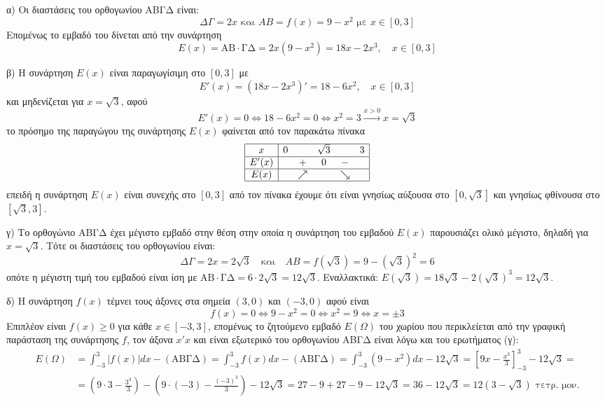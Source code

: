 α) Οι διαστάσεις του ορθογωνίου ΑΒΓΔ είναι:
\[ \Delta\Gamma = 2x \text{ και } AB = f(x) = 9-x^2 \text{ με } x \in [0,3] \]
Επομένως το εμβαδό του δίνεται από την συνάρτηση
\[ E(x) = \text{ΑΒ} \cdot \text{ΓΔ} = 2x(9-x^2) = 18x - 2x^3, \quad x \in [0,3] \]

β) Η συνάρτηση $E(x)$ είναι παραγωγίσιμη στο $[0,3]$ με
\[ E'(x)=(18x-2x^3)' = 18-6x^2, \quad x \in [0,3] \]
και μηδενίζεται για $x = \sqrt{3}$, αφού
\[ E'(x)=0 \Leftrightarrow 18-6x^2=0 \Leftrightarrow x^2=3 \xrightarrow{x>0} x=\sqrt{3} \]
το πρόσημο της παραγώγου της συνάρτησης $E(x)$ φαίνεται από τον παρακάτω πίνακα
\[
\begin{array}{|c|ccccc|}
\hline
x & 0 & & \sqrt{3} & & 3 \\
\hline
E'(x) & & + & 0 & - & \\
\hline
E(x) & & \nearrow & & \searrow & \\
\hline
\end{array}
\]
επειδή η συνάρτηση $E(x)$ είναι συνεχής στο $[0,3]$ από τον πίνακα έχουμε ότι είναι γνησίως αύξουσα στο $[0, \sqrt{3}]$ και γνησίως φθίνουσα στο $[\sqrt{3},3]$.

γ) Το ορθογώνιο ΑΒΓΔ έχει μέγιστο εμβαδό στην θέση στην οποία η συνάρτηση του εμβαδού $E(x)$ παρουσιάζει ολικό μέγιστο, δηλαδή για $x = \sqrt{3}$. Τότε οι διαστάσεις του ορθογωνίου είναι:
\[ \Delta\Gamma = 2x = 2\sqrt{3} \quad \text{και} \quad AB = f(\sqrt{3}) = 9 - (\sqrt{3})^2 = 6 \]
οπότε η μέγιστη τιμή του εμβαδού είναι ίση με $\text{ΑΒ} \cdot \text{ΓΔ} = 6 \cdot 2\sqrt{3} = 12\sqrt{3}$.
Εναλλακτικά: $E(\sqrt{3}) = 18\sqrt{3} - 2(\sqrt{3})^3 = 12\sqrt{3}$.

δ) Η συνάρτηση $f(x)$ τέμνει τους άξονες στα σημεία $(3,0)$ και $(-3,0)$ αφού είναι
\[ f(x)=0 \Leftrightarrow 9-x^2=0 \Leftrightarrow x^2=9 \Leftrightarrow x = \pm 3 \]
Επιπλέον είναι $f(x) \geq 0$ για κάθε $x \in [-3,3]$, επομένως το ζητούμενο εμβαδό $E(\Omega)$ του χωρίου που περικλείεται από την γραφική παράσταση της συνάρτησης $f$, τον άξονα $x'x$ και είναι εξωτερικό του ορθογωνίου ΑΒΓΔ είναι λόγω και του ερωτήματος (γ):
\begin{align*} E(\Omega) &= \int_{-3}^{3}|f(x)|dx - (\text{ΑΒΓΔ}) = \int_{-3}^{3}f(x)dx - (\text{ΑΒΓΔ}) = \int_{-3}^{3}(9-x^2)dx - 12\sqrt{3} = \left[9x-\frac{x^3}{3}\right]_{-3}^3 - 12\sqrt{3} = \\ &= \left(9\cdot3 - \frac{3^3}{3}\right) - \left(9\cdot(-3) - \frac{(-3)^3}{3}\right) - 12\sqrt{3} = 27-9+27-9-12\sqrt{3} = 36-12\sqrt{3} = 12(3-\sqrt{3}) \text{ τετρ. μον.} \end{align*}

